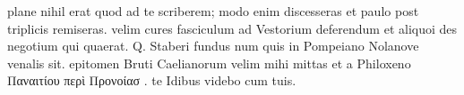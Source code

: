 


 plane nihil erat quod ad te scriberem; modo enim discesseras et paulo post triplicis remiseras. velim cures fasciculum ad Vestorium deferendum et aliquoi des negotium qui quaerat. Q. Staberi fundus num quis in Pompeiano Nolanove venalis sit. epitomen Bruti Caelianorum velim mihi mittas et a Philoxeno Παναιτίου περὶ Προνοίασ . te Idibus videbo cum tuis.
